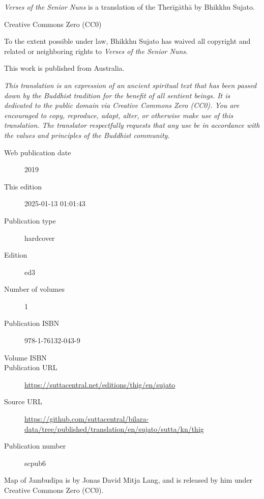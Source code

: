 \documentclass[12pt,openany]{book}%
\begin{document}
\begin{footnotesize}

\textit{Verses of the Senior Nuns} is a translation of the Therīgāthā by Bhikkhu Sujato.

\medskip

Creative Commons Zero (CC0)

To the extent possible under law, Bhikkhu Sujato has waived all copyright and related or neighboring rights to \textit{Verses of the Senior Nuns}.

\medskip

This work is published from Australia.

\begin{center}
\textit{This translation is an expression of an ancient spiritual text that has been passed down by the Buddhist tradition for the benefit of all sentient beings. It is dedicated to the public domain via Creative Commons Zero (CC0). You are encouraged to copy, reproduce, adapt, alter, or otherwise make use of this translation. The translator respectfully requests that any use be in accordance with the values and principles of the Buddhist community.}
\end{center}

\medskip

\begin{description}
    \item[Web publication date] 2019
    \item[This edition] 2025-01-13 01:01:43
    \item[Publication type] hardcover
    \item[Edition] ed3
    \item[Number of volumes] 1
    \item[Publication ISBN] 978-1-76132-043-9
    \item[Volume ISBN] 
    \item[Publication URL] \href{https://suttacentral.net/editions/thig/en/sujato}{https://suttacentral.net/editions/thig/en/sujato}
    \item[Source URL] \href{https://github.com/suttacentral/bilara-data/tree/published/translation/en/sujato/sutta/kn/thig}{https://github.com/suttacentral/bilara-data/tree/published/translation/en/sujato/sutta/kn/thig}
    \item[Publication number] scpub6
\end{description}

\medskip

Map of Jambudīpa is by Jonas David Mitja Lang, and is released by him under Creative Commons Zero (CC0).


\end{footnotesize}
\end{document}
